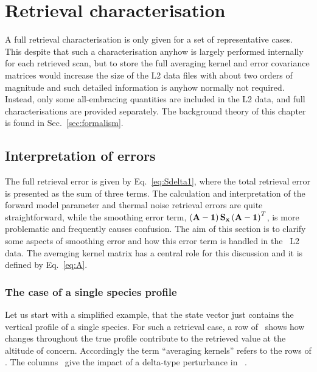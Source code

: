\chapter{Retrieval characterisation}
\label{chapter:characterisation}
%
A full retrieval characterisation is only given for a set of representative
cases. This despite that such a characterisation anyhow is largely performed
internally for each retrieved scan, but to store the full averaging kernel and
error covariance matrices would increase the size of the L2 data files with
about two orders of magnitude and such detailed information is anyhow normally
not required. Instead, only some all-embracing quantities are included in the
L2 data, and full characterisations are provided separately. The background
theory of this chapter is found in Sec.~\ref{sec:formalism}.
 


\section{Interpretation of errors}
\label{sec:char:interpret}
%
The full retrieval error is given by Eq.~\ref{eq:Sdelta1}, where the total
retrieval error is presented as the sum of three terms. The calculation and
interpretation of the forward model parameter and thermal noise retrieval
errors are quite straightforward, while the smoothing error term,
$\left(\mathbf{A}-\mathbf{1}\right)\mathbf{S}_{\mathbf{x}}\left(\mathbf{A}-\mathbf{1}\right)^T$,
is more problematic and frequently causes confusion. The aim of this section
is to clarify some aspects of smoothing error and how this error term is
handled in the \smr\ L2 data. The averaging kernel matrix has a central
role for this discussion and it is defined by Eq.~\ref{eq:A}.


\subsection*{The case of a single species profile}
%
Let us start with a simplified example, that the state vector just contains the
vertical profile of a single species. For such a retrieval case, a row of
\AvrKrnMtr\ shows how changes throughout the true profile contribute to the
retrieved value at the altitude of concern. Accordingly the term ``averaging
kernels'' refers to the rows of \AvrKrnMtr. The columns \AvrKrnMtr\ give the
impact of a delta-type perturbance in \SttVct\ \citep{rodgers:00}.

